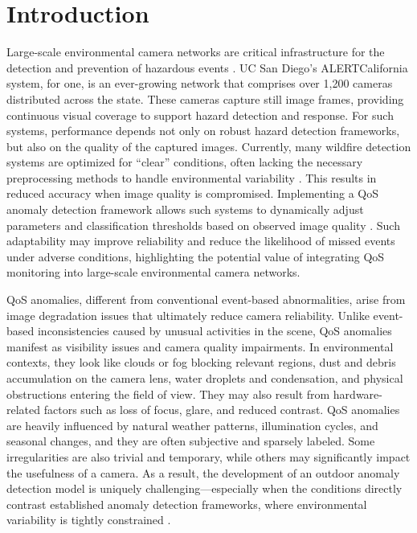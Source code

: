 \documentclass[remotesensing,article,submit,moreauthors]{Definitions/mdpi}
\begin{document}


\section{Introduction}

Large-scale environmental camera networks are critical infrastructure for the detection and prevention of hazardous events \cite{costa2020use, govil2020preliminary, mohapatra2022early}. UC San Diego's ALERTCalifornia system, for one, is an ever-growing network that comprises over 1,200 cameras distributed across the state. These cameras capture still image frames, providing continuous visual coverage to support hazard detection and response. For such systems, performance depends not only on robust hazard detection frameworks, but also on the quality of the captured images\cite{mahadev2026intelligent, wang2022semi}. Currently, many wildfire detection systems are optimized for ``clear'' conditions, often lacking the necessary preprocessing methods to handle environmental variability \cite{mahadev2026intelligent, wang2022semi}. This results in reduced accuracy when image quality is compromised. Implementing a \ac{QoS} anomaly detection framework allows such systems to dynamically adjust parameters and classification thresholds based on observed image quality \cite{govil2020preliminary}. Such adaptability may improve reliability and reduce the likelihood of missed events under adverse conditions, highlighting the potential value of integrating \ac{QoS} monitoring into large-scale environmental camera networks.

\Ac{QoS} anomalies, different from conventional event-based abnormalities, arise from image degradation issues that ultimately reduce camera reliability. Unlike event-based inconsistencies caused by unusual activities in the scene, \ac{QoS} anomalies manifest as visibility issues and camera quality impairments. In environmental contexts, they look like clouds or fog blocking relevant regions, dust and debris accumulation on the camera lens, water droplets and condensation, and physical obstructions entering the field of view. They may also result from hardware-related factors such as loss of focus, glare, and reduced contrast. \Ac{QoS} anomalies are heavily influenced by natural weather patterns, illumination cycles, and seasonal changes, and they are often subjective and sparsely labeled. Some irregularities are also trivial and temporary, while others may significantly impact the usefulness of a camera. As a result, the development of an outdoor anomaly detection model is uniquely challenging—especially when the conditions directly contrast established anomaly detection frameworks, where environmental variability is tightly constrained \cite{bergmann2019mvtec, lin2025visual}.
\end{document}
